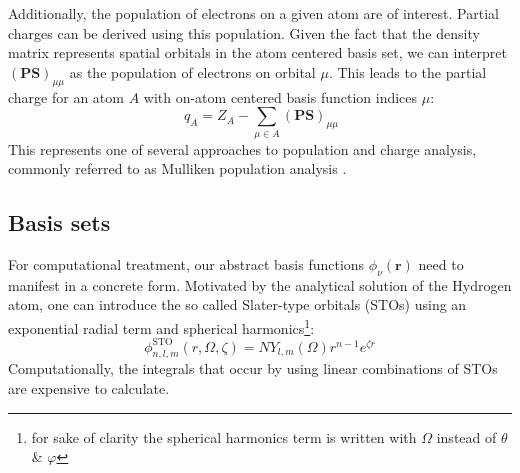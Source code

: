 Additionally, the population of electrons on a given atom are of interest. Partial charges can be derived using this population. Given the fact that the density matrix represents spatial orbitals in the atom centered basis set, we can interpret $\mathbf{(PS)}_{\mu \mu}$ as the population of electrons on orbital $\mu$. This leads to the partial charge for an atom $A$ with on-atom centered basis function indices $\mu$:
\begin{equation}
    \
    q_A = Z_A - \sum_{\mu \in A} \mathbf{(PS)}_{\mu \mu}
\end{equation}
This represents one of several approaches to population and charge analysis, commonly referred to as Mulliken population analysis \parencite{ref:mulliken1955electronic}. 
\subsection{Basis sets}
\label{subsec:background_hf_basis_sets}
For computational treatment, our abstract basis functions $\phi_\nu(\mathbf{r})$ need to manifest in a concrete form. 
Motivated by the analytical solution of the Hydrogen atom, one can introduce the so called Slater-type orbitals (STOs) using an exponential radial term and spherical harmonics\footnote{for sake of clarity the spherical harmonics term is written with $\Omega$ instead of $\theta$ \& $\varphi$}: 
\begin{equation}
    \label{eq:slater_orbital}
    \phi_{n, l, m}^{\text{STO}}(r, \Omega, \zeta) = N Y_{l,m}(\Omega) r^{n-1} e^{\zeta r}
\end{equation} 
Computationally, the integrals that occur by using linear combinations of STOs are expensive to calculate. \\

